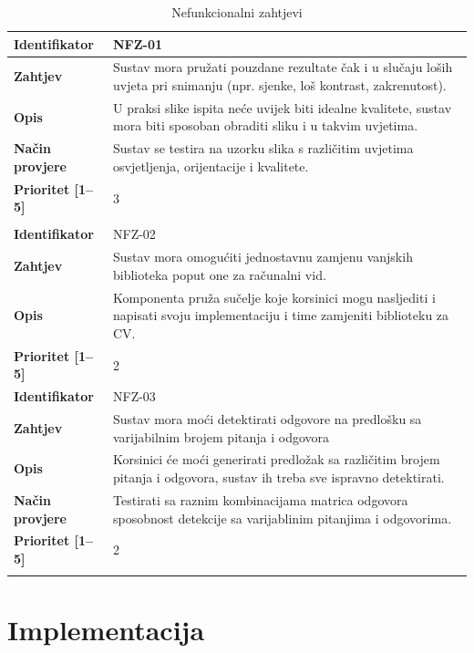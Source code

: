 \documentclass{foi}
\begin{document}
\begin{longtable}{|l|p{12cm}|}
    \hline
    \textbf{Identifikator} & NFZ-01 \\ \hline
    \textbf{Zahtjev} & Sustav mora pružati pouzdane rezultate čak i u slučaju loših uvjeta pri snimanju (npr. sjenke, loš kontrast, zakrenutost). \\ \hline
    \textbf{Opis} & U praksi slike ispita neće uvijek biti idealne kvalitete, sustav mora biti sposoban obraditi sliku i u takvim uvjetima. \\ \hline
    \textbf{Način provjere} & Sustav se testira na uzorku slika s različitim uvjetima osvjetljenja, orijentacije i kvalitete. \\ \hline
    \textbf{Prioritet [1--5]} & 3 \\ \hline
    \multicolumn{2}{|c|}{} \\ \hline

    \textbf{Identifikator} & NFZ-02 \\ \hline
    \textbf{Zahtjev} & Sustav mora omogućiti jednostavnu zamjenu vanjskih biblioteka poput one za računalni vid. \\ \hline
    \textbf{Opis} & Komponenta pruža sučelje koje korsinici mogu nasljediti i napisati svoju implementaciju i time zamjeniti biblioteku za CV. \\ \hline
    \textbf{Prioritet [1--5]} & 2 \\ \hline

    \pagebreak
    
    \hline
    \textbf{Identifikator} & NFZ-03  \\ \hline
    \textbf{Zahtjev} & Sustav mora moći detektirati odgovore na predlošku sa varijabilnim brojem pitanja i odgovora \\ \hline
    \textbf{Opis} & Korsinici će moći generirati predložak sa različitim brojem pitanja i odgovora, sustav ih treba sve ispravno detektirati. \\ \hline
    \textbf{Način provjere} & Testirati sa raznim kombinacijama matrica odgovora sposobnost detekcije sa varijablinim pitanjima i odgovorima. \\ \hline
    \textbf{Prioritet [1--5]} & 2  \\ \hline
    
    \caption{Nefunkcionalni zahtjevi}
\end{longtable}
    
\section{Implementacija}
\end{document}
